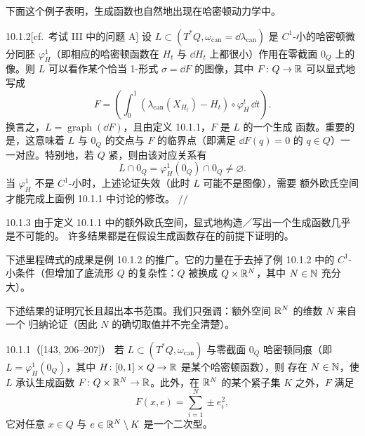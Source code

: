 下面这个例子表明，生成函数也自然地出现在哈密顿动力学中。

\begin{wexam}{10.1.2}[cf.\ 考试 III 中的问题 A]
  设 $L\subset(T^*Q,\omega_{\mathrm{can}}=\dd\lambda_{\mathrm{can}})$ 是
  $C^1$-小的哈密顿微分同胚 $\varphi_H^1$（即相应的哈密顿函数在 $H_t$ 与
  $\dd H_t$ 上都很小）作用在零截面 $0_Q$ 上的像。则 $L$ 可以看作某个恰当 1-形式
  $\sigma=\dd F$ 的图像，其中 $F\colon Q\to\mathbb{R}$ 可以显式地写成
  \[
    F=\left(\int_0^1\left(\lambda_{\mathrm{can}}(X_{H_t})-H_t\right)
    \circ\varphi_H^t\,\dd t\right).
  \]
  换言之，$L=\operatorname{graph}(\dd F)$，且由定义 10.1.1，$F$ 是 $L$ 的一个生成
  函数。重要的是，这意味着 $L$ 与 $0_Q$ 的交点与 $F$ 的临界点（即满足
  $\dd F(q)=0$ 的 $q\in Q$）一一对应。特别地，若 $Q$ 紧，则由该对应关系有
  \begin{equation}\tag{10.4}
    L\cap 0_Q=\varphi_H^1(0_Q)\cap 0_Q\ne\varnothing.
  \end{equation}
  当 $\varphi_H^1$ 不是 $C^1$-小时，上述论证失效（此时 $L$ 可能不是图像），需要
  额外欧氏空间才能完成上面例 10.1.1 中讨论的修改。
  \hfill$//$
\end{wexam}


\begin{wrem}{10.1.3}
  由于定义 10.1.1 中的额外欧氏空间，显式地构造／写出一个生成函数几乎是不可能的。
  许多结果都是在假设生成函数存在的前提下证明的。
\end{wrem}

下述里程碑式的成果是例 10.1.2 的推广。它的力量在于去掉了例 10.1.2 中的
$C^1$-小条件（但增加了底流形 $Q$ 的复杂性：$Q$ 被换成 $Q\times\mathbb{R}^N$，其中
$N\in\mathbb{N}$ 充分大）。

下述结果的证明冗长且超出本书范围。我们只强调：额外空间 $\mathbb{R}^N$ 的维数 $N$ 来自一个
归纳论证（因此 $N$ 的确切取值并不完全清楚）。

\begin{wthm}{10.1.1（[143, 206--207]）}
  若 $L\subset(T^*Q,\omega_{\mathrm{can}})$ 与零截面 $0_Q$ 哈密顿同痕（即
  $L=\varphi_H^1(0_Q)$，其中 $H\colon[0,1]\times Q\to\mathbb{R}$ 是某个哈密顿函数），则
  存在 $N\in\mathbb{N}$，使 $L$ 承认生成函数 $F\colon Q\times\mathbb{R}^N\to\mathbb{R}$。此外，在
  $\mathbb{R}^N$ 的某个紧子集 $K$ 之外，$F$ 满足
  \[
    F(x,e)=\sum_{i=1}^{N}\pm e_i^2,
  \]
  它对任意 $x\in Q$ 与 $e\in\mathbb{R}^N\setminus K$ 是一个二次型。
\end{wthm}

